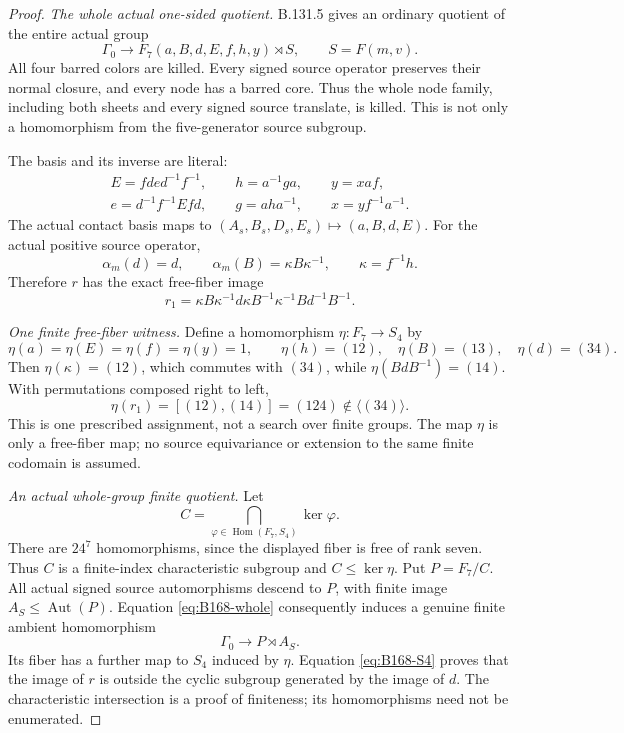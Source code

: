 \begin{proof}
\emph{The whole actual one-sided quotient.}
B.131.5 gives an ordinary quotient of the entire actual group
\begin{equation}\label{eq:B168-whole}
 \Gamma_0\longrightarrow
 F_7(a,B,d,E,f,h,y)\rtimes S,\qquad S=F(m,v).
\end{equation}
All four barred colors are killed. Every signed source operator
preserves their normal closure, and every node has a barred core.
Thus the whole node family, including both sheets and every signed
source translate, is killed. This is not only a homomorphism from
the five-generator source subgroup.

The basis and its inverse are literal:
\[
 \begin{gathered}
 E=fde d^{-1}f^{-1},\qquad h=a^{-1}ga,\qquad y=xaf,\\
 e=d^{-1}f^{-1}Efd,\qquad g=aha^{-1},\qquad x=yf^{-1}a^{-1}.
 \end{gathered}
\]
The actual contact basis maps to
\((A_s,B_s,D_s,E_s)\mapsto(a,B,d,E)\).
For the actual positive source operator,
\[
 \alpha_m(d)=d,\qquad
 \alpha_m(B)=\kappa B\kappa^{-1},\qquad\kappa=f^{-1}h.
\]
Therefore \(r\) has the exact free-fiber image
\begin{equation}\label{eq:B168-fiber-word}
 r_1=\kappa B\kappa^{-1}d\kappa B^{-1}\kappa^{-1}
                       B d^{-1}B^{-1}.
\end{equation}

\emph{One finite free-fiber witness.}
Define a homomorphism \(\eta:F_7\to S_4\) by
\[
 \eta(a)=\eta(E)=\eta(f)=\eta(y)=1,\qquad
 \eta(h)=(12),\quad\eta(B)=(13),\quad\eta(d)=(34).
\]
Then \(\eta(\kappa)=(12)\), which commutes with \((34)\), while
\(\eta(BdB^{-1})=(14)\). With permutations composed right to left,
\begin{equation}\label{eq:B168-S4}
               \eta(r_1)=[(12),(14)]=(124)
                    \notin\langle(34)\rangle.
\end{equation}
This is one prescribed assignment, not a search over finite groups.
The map \(\eta\) is only a free-fiber map; no source equivariance or
extension to the same finite codomain is assumed.

\emph{An actual whole-group finite quotient.}
Let
\[
 C=\bigcap_{\varphi\in\operatorname{Hom}(F_7,S_4)}\ker\varphi.
\]
There are \(24^7\) homomorphisms, since the displayed fiber is free
of rank seven. Thus \(C\) is a finite-index characteristic subgroup
and \(C\le\ker\eta\). Put \(P=F_7/C\).
All actual signed source automorphisms descend to \(P\), with finite
image \(A_S\le\operatorname{Aut}(P)\).
Equation \eqref{eq:B168-whole} consequently induces a genuine finite
ambient homomorphism
\[
                       \Gamma_0\longrightarrow P\rtimes A_S.
\]
Its fiber has a further map to \(S_4\) induced by \(\eta\).
Equation \eqref{eq:B168-S4} proves that the image of \(r\) is outside
the cyclic subgroup generated by the image of \(d\).
The characteristic intersection is a proof of finiteness; its
homomorphisms need not be enumerated.


\end{proof}
